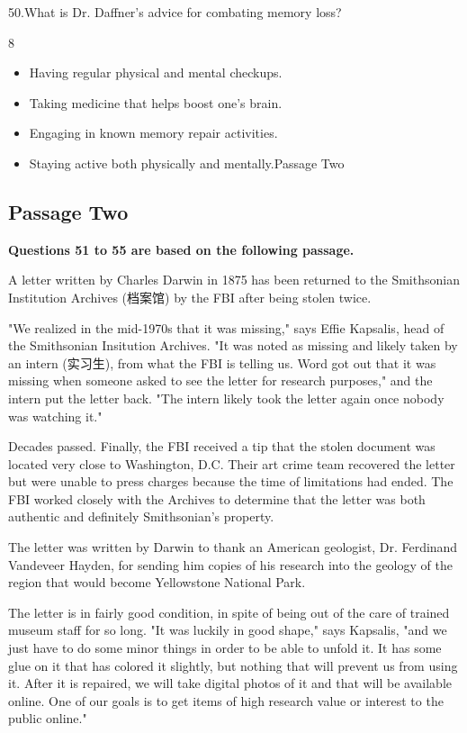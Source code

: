 \documentclass[UTF8,11pt]{ctexart}
\begin{document}
50.What is Dr. Daffner's advice for combating memory loss?


8


\begin{itemize}[leftmargin=2em,itemsep=.2em,topsep=.4em]\item[A.] Having regular physical and mental checkups.
\item[B.] Taking medicine that helps boost one's brain.
\item[C.] Engaging in known memory repair activities.
\item[D.] Staying active both physically and mentally.Passage Two
\end{itemize}

\subsection*{\textbf{Passage Two}}


\textbf{Questions 51 to 55 are based on the following passage.}


A letter written by Charles Darwin in 1875 has been returned to the Smithsonian Institution Archives (档案馆) by the FBI after being stolen twice.


"We realized in the mid-1970s that it was missing," says Effie Kapsalis, head of the Smithsonian Insitution Archives. "It was noted as missing and likely taken by an intern (实习生), from what the FBI is telling us. Word got out that it was missing when someone asked to see the letter for research purposes," and the intern put the letter back. "The intern likely took the letter again once nobody was watching it."


Decades passed. Finally, the FBI received a tip that the stolen document was located very close to Washington, D.C. Their art crime team recovered the letter but were unable to press charges because the time of limitations had ended. The FBI worked closely with the Archives to determine that the letter was both authentic and definitely Smithsonian's property.


The letter was written by Darwin to thank an American geologist, Dr. Ferdinand Vandeveer Hayden, for sending him copies of his research into the geology of the region that would become Yellowstone National Park.


The letter is in fairly good condition, in spite of being out of the care of trained museum staff for so long. "It was luckily in good shape," says Kapsalis, "and we just have to do some minor things in order to be able to unfold it. It has some glue on it that has colored it slightly, but nothing that will prevent us from using it. After it is repaired, we will take digital photos of it and that will be available online. One of our goals is to get items of high research value or interest to the public online."
\end{document}
